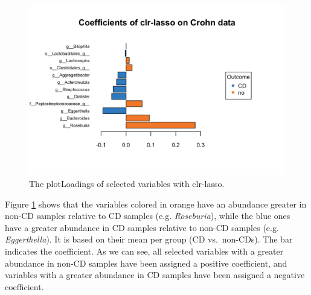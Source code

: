 \documentclass[openany]{book}
\newenvironment{Shaded}{\begin{snugshade}}{\end{snugshade}}
\newcommand{\KeywordTok}[1]{\textcolor[rgb]{0.13,0.29,0.53}{\textbf{#1}}}
\newcommand{\DataTypeTok}[1]{\textcolor[rgb]{0.13,0.29,0.53}{#1}}
\newcommand{\StringTok}[1]{\textcolor[rgb]{0.31,0.60,0.02}{#1}}
\newcommand{\CommentTok}[1]{\textcolor[rgb]{0.56,0.35,0.01}{\textit{#1}}}
\newcommand{\OperatorTok}[1]{\textcolor[rgb]{0.81,0.36,0.00}{\textbf{#1}}}
\newcommand{\NormalTok}[1]{#1}
\begin{document}
\begin{Shaded}
\end{Shaded}

\begin{figure}

{\centering \includegraphics[width=1\linewidth]{./Generated_plots/loadclrCD-1} 

}

\caption{The plotLoadings of selected variables with clr-lasso.}\label{fig:loadclrCD}
\end{figure}

Figure \ref{fig:loadclrCD} shows that the variables colored in orange
have an abundance greater in non-CD samples relative to CD samples (e.g.
\emph{Roseburia}), while the blue ones have a greater abundance in CD
samples relative to non-CD samples (e.g. \emph{Eggerthella}). It is
based on their mean per group (CD vs.~non-CDs). The bar indicates the
coefficient. As we can see, all selected variables with a greater
abundance in non-CD samples have been assigned a positive coefficient,
and variables with a greater abundance in CD samples have been assigned
a negative coefficient.
\end{document}
